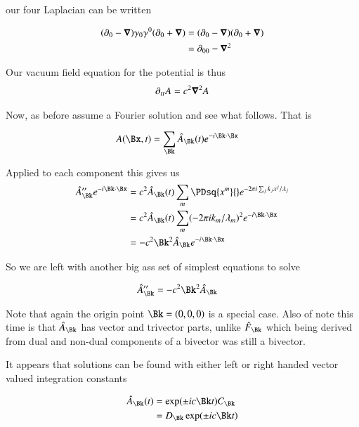 our four Laplacian can be written

\begin{align*}
(\partial_0 - \boldsymbol{\nabla}) \gamma_0 \gamma^0(\partial_0 + \boldsymbol{\nabla}) 
&= (\partial_0 - \boldsymbol{\nabla}) (\partial_0 + \boldsymbol{\nabla}) \\
&= \partial_{00} - \boldsymbol{\nabla}^2
\end{align*}

Our vacuum field equation for the potential is thus
\begin{align}
\partial_{tt} A = c^2 \boldsymbol{\nabla}^2 A
\end{align}

Now, as before assume a Fourier solution and see what follows.  That is

\begin{align}\label{eqn:potential_fourier:assumedPotential}
A(\Bx, t) &= \sum_{\Bk} \hat{A}_{\Bk}(t) e^{ -i \Bk \cdot \Bx}
\end{align}

Applied to each component this gives us
\begin{align*}
\hat{A}_{\Bk}'' e^{ -i \Bk \cdot \Bx} 
&= c^2 \hat{A}_{\Bk}(t) \sum_m \PDsq{x^m}{} e^{ - 2 \pi i \sum_j k_j x^j /\lambda_j} \\
&= c^2 \hat{A}_{\Bk}(t) \sum_m (- 2 \pi i k_m/\lambda_m)^2 e^{ - i \Bk \cdot \Bx } \\
&= -c^2 \Bk^2 \hat{A}_{\Bk} e^{ - i \Bk \cdot \Bx }
\end{align*}

So we are left with another big ass set of simplest equations to solve

\begin{align*}
\hat{A}_{\Bk}'' &= -c^2 \Bk^2 \hat{A}_{\Bk}
\end{align*}

Note that again the origin point $\Bk = (0,0,0)$ is a special case.  Also of note this time is that $\hat{A}_{\Bk}$ has vector and trivector parts, unlike $\hat{F}_{\Bk}$ which being derived from dual and non-dual components of a bivector was still a bivector.

It appears that solutions can be found with either left or right handed
vector valued integration constants

\begin{align*}
\hat{A}_{\Bk}(t) &= \exp(\pm i c \Bk t) C_{\Bk} \\
                 &= D_{\Bk} \exp(\pm i c \Bk t)
\end{align*}


